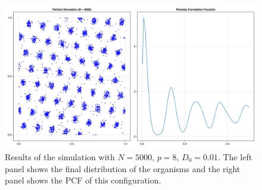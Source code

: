 \documentclass{article}
\begin{document}
\begin{figure}
    \label{clumped}
    \includegraphics[width=1.0\linewidth]{img/rp68_N5000_D01_p8.png}
    \caption{Results of the simulation with $N=5000$, $p=8$, $D_0=0.01$. The left panel shows the final distribution of the organisms and the right panel shows the PCF of this configuration.}
\end{figure}
\end{document}
